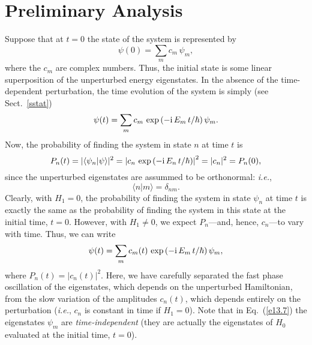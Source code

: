 \section{Preliminary Analysis}\label{s13.2}
Suppose that at $t=0$ the  state of the system is represented by
\begin{equation}
\psi(0) = \sum_m c_m\,\psi_m,
\end{equation}
where the $c_m$ are complex numbers. Thus, the initial state is some
linear superposition of the unperturbed energy eigenstates. In the
absence of the time-dependent perturbation, the time evolution
of the system is simply (see Sect.~\ref{sstat})
\begin{equation}
\psi(t) = \sum_m c_m\,\exp\left(-{\rm i}\,E_m\,t/\hbar\right)\psi_m.
\end{equation}
Now, the probability of finding the system in state $n$ at time $t$ is
\begin{equation}
P_n(t) = |\langle \psi_n|\psi\rangle|^2 = \left|
c_n\,\exp\left(-{\rm i}\,E_n\,t/\hbar\right)\right|^2 = |c_n|^2 = P_n(0),
\end{equation}
since the unperturbed eigenstates are assummed to be orthonormal:
{\em i.e.},
\begin{equation}\label{e13.6}
\langle n|m\rangle =\delta_{nm}.
\end{equation}
Clearly, with $H_1=0$, the probability of finding the system in state
$\psi_n$ at time $t$ is exactly the same as the probability of finding the
system in this state at the initial time, $t=0$. However, with $H_1\neq 0$,
we expect $P_n$---and, hence, $c_n$---to vary with time. Thus, we can write
\begin{equation}\label{e13.7}
\psi(t) = \sum_m c_m(t)\,\exp\left(-{\rm i}\,E_m\,t/\hbar\right)\psi_m,
\end{equation}
where $P_n(t)=|c_n(t)|^2$. Here, we have carefully separated the
fast phase oscillation of the eigenstates, which depends on the
unperturbed Hamiltonian, from the slow variation of the
amplitudes $c_n(t)$, which depends entirely on the perturbation
({\em i.e.}, $c_n$ is constant in time if $H_1=0$). Note that in Eq.~(\ref{e13.7}) the eigenstates $\psi_m$ are {\em time-independent} (they are actually the eigenstates of $H_0$ evaluated at the initial time, $t=0$).

